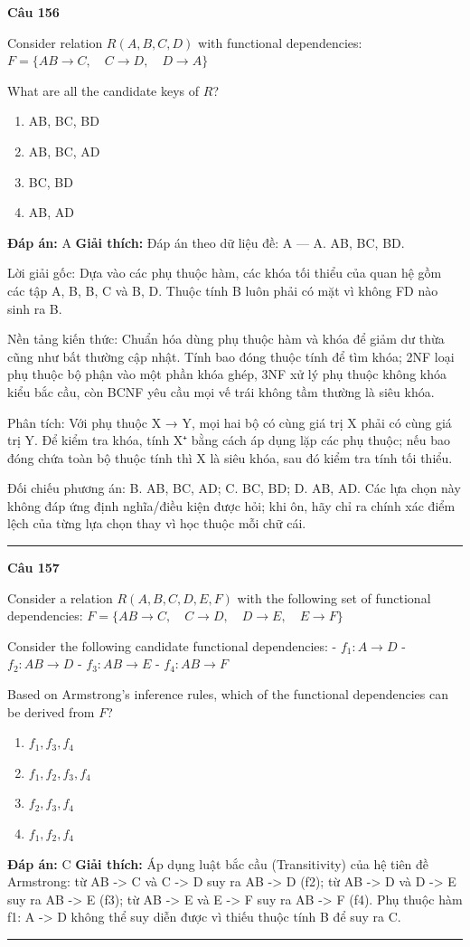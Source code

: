 \documentclass[11pt,a4paper]{article}
\newenvironment{question}[1]{%
  \par\vspace{1em}\noindent\textbf{\large Câu #1}\par\vspace{0.4em}
}{%
  \par\vspace{1em}\hrule\vspace{0.6em}
}
\newenvironment{choices}{%
  \begin{enumerate}[label=\textbf{\Alph*.},leftmargin=2.2em,itemsep=2pt,topsep=3pt]
}{%
  \end{enumerate}
}
\newcommand{\choice}{\item}
\begin{document}
\begin{question}{156}
Consider relation \(R(A, B, C, D)\) with functional dependencies:
\(F = \{ AB \rightarrow C, \quad C \rightarrow D, \quad D \rightarrow A \}\)

What are all the candidate keys of \(R\)?
\begin{choices}
\choice AB, BC, BD
\choice AB, BC, AD
\choice BC, BD
\choice AB, AD
\end{choices}
\textbf{Đáp án:} A
\textbf{Giải thích:} Đáp án theo dữ liệu đề: A — A. AB, BC, BD.

Lời giải gốc: Dựa vào các phụ thuộc hàm, các khóa tối thiểu của quan hệ gồm các tập {A, B}, {B, C} và {B, D}. Thuộc tính B luôn phải có mặt vì không FD nào sinh ra B.

Nền tảng kiến thức: Chuẩn hóa dùng phụ thuộc hàm và khóa để giảm dư thừa cũng như bất thường cập nhật. Tính bao đóng thuộc tính để tìm khóa; 2NF loại phụ thuộc bộ phận vào một phần khóa ghép, 3NF xử lý phụ thuộc không khóa kiểu bắc cầu, còn BCNF yêu cầu mọi vế trái không tầm thường là siêu khóa.

Phân tích: Với phụ thuộc X → Y, mọi hai bộ có cùng giá trị X phải có cùng giá trị Y. Để kiểm tra khóa, tính X⁺ bằng cách áp dụng lặp các phụ thuộc; nếu bao đóng chứa toàn bộ thuộc tính thì X là siêu khóa, sau đó kiểm tra tính tối thiểu.

Đối chiếu phương án: B. AB, BC, AD; C. BC, BD; D. AB, AD. Các lựa chọn này không đáp ứng định nghĩa/điều kiện được hỏi; khi ôn, hãy chỉ ra chính xác điểm lệch của từng lựa chọn thay vì học thuộc mỗi chữ cái.
\end{question}


\begin{question}{157}
Consider a relation \(R(A, B, C, D, E, F)\) with the following set of functional dependencies:
\(F = \{ AB \rightarrow C, \quad C \rightarrow D, \quad D \rightarrow E, \quad E \rightarrow F \}\)

Consider the following candidate functional dependencies:
- \(f_1: A \rightarrow D\)
- \(f_2: AB \rightarrow D\)
- \(f_3: AB \rightarrow E\)
- \(f_4: AB \rightarrow F\)

Based on Armstrong's inference rules, which of the functional dependencies can be derived from \(F\)?
\begin{choices}
\choice \(f_1, f_3, f_4\)
\choice \(f_1, f_2, f_3, f_4\)
\choice \(f_2, f_3, f_4\)
\choice \(f_1, f_2, f_4\)
\end{choices}
\textbf{Đáp án:} C
\textbf{Giải thích:} Áp dụng luật bắc cầu (Transitivity) của hệ tiên đề Armstrong: từ AB -> C và C -> D suy ra AB -> D (f2); từ AB -> D và D -> E suy ra AB -> E (f3); từ AB -> E và E -> F suy ra AB -> F (f4). Phụ thuộc hàm f1: A -> D không thể suy diễn được vì thiếu thuộc tính B để suy ra C.
\end{question}
\end{document}
